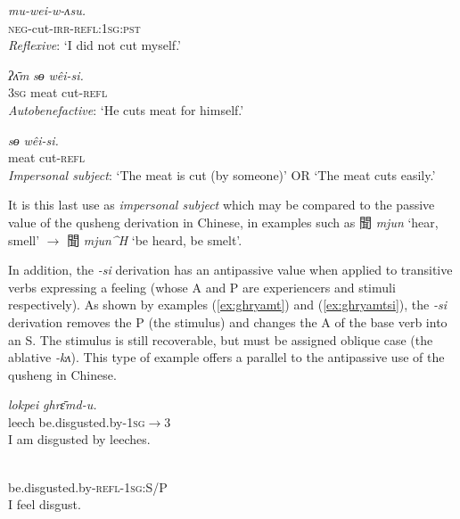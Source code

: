 \documentclass[oneside,a4paper,11pt]{article}
\newcommand{\ipa}[1]{{\phon\textit{\mbox{#1}}}}
\newcommand{\zh}[1]{{\cn#1}}
\newcommand{\ch}[3]{\zh{#1} \ipa{#2} `#3'}
\begin{document}
\begin{exe}
\ex \label{ex:weiwasu} 
\gll 
	\ipa{mu-wei-w-ʌsu.}  \\
\textsc{neg}-cut-\textsc{irr}-\textsc{refl:1sg:pst} \\
\glt \textit{Reflexive}: `I did not cut myself.'
\end{exe}  

\begin{exe}
\ex \label{ex:weisi2} 
\gll 
 \ipa{ʔʌ̄m} \ipa{sɵ}  	\ipa{wêi-si.}  \\
\textsc{3sg} meat cut-\textsc{refl} \\
\glt \textit{Autobenefactive}: `He cuts meat for himself.'
\end{exe}
 
\begin{exe}
\ex \label{ex:weisi} 
\gll 
 \ipa{sɵ}  	\ipa{wêi-si.}  \\
 meat cut-\textsc{refl} \\
\glt \textit{Impersonal subject}: `The meat is cut (by someone)' OR `The meat cuts easily.'
\end{exe}

It is this last use as \textit{impersonal subject} which may be compared to the passive value of the qusheng derivation in Chinese, in examples such as \ch{聞}{mjun}{hear, smell} $\rightarrow$ \ch{聞}{mjun^H}{be heard, be smelt}.

In addition, the \ipa{-si} derivation has an antipassive value when applied to transitive verbs expressing a feeling (whose A and P are experiencers and stimuli respectively). As shown by examples (\ref{ex:ghryamt})  and (\ref{ex:ghryamtsi}), the \ipa{-si} derivation removes the P (the stimulus) and changes the A of the base verb into an S. The stimulus is still recoverable, but must be assigned oblique case (the ablative \ipa{-kʌ}). This type of example offers a parallel to the antipassive use of the qusheng in Chinese.

\begin{exe}
\ex \label{ex:ghryamt} 
\gll 
  	\ipa{lokpei}  	\ipa{ghrɛ̄md-u.}  \\
leech  be.disgusted.by-\textsc{1sg$\rightarrow$3} \\
 \glt  I am disgusted by leeches.
\end{exe}

\begin{exe}
\ex \label{ex:ghryamtsi} 
\gll \ipa{gʰrɛ̄m-si-ŋʌ}\\
 be.disgusted.by-\textsc{refl-1sg:S/P} \\
\glt  I feel disgust.
\end{exe}
\end{document}
